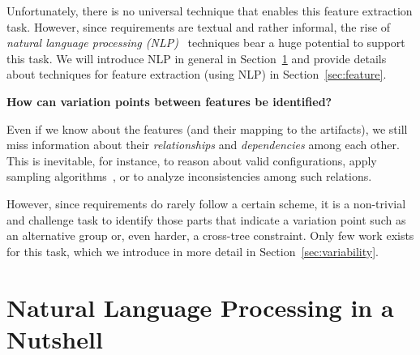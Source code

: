 \documentclass[graybox]{svmult}
\begin{document}
Unfortunately, there is no universal technique that enables this feature extraction task.
However, since requirements are textual and rather informal, the rise of \textit{natural language processing (NLP)}~\cite{IndurkhyaD10} techniques bear a huge potential to support this task.
We will introduce NLP in general in Section~\ref{sec:nlp} and provide details about techniques for feature extraction (using NLP) in Section~\ref{sec:feature}.

\begin{center}
    \textbf{How can variation points between features be identified?}
\end{center}

Even if we know about the features (and their mapping to the artifacts), we still miss information about their \textit{relationships} and \textit{dependencies} among each other.
This is inevitable, for instance, to reason about valid configurations, apply sampling algorithms~\cite{VarshosazATRMS18}, or to analyze inconsistencies among such relations.

However, since requirements do rarely follow a certain scheme, it is a non-trivial and challenge task to identify those parts that indicate a variation point such as an alternative group or, even harder, a cross-tree constraint.
Only few work exists for this task, which we introduce in more detail in Section~\ref{sec:variability}.



\section{Natural Language Processing in a Nutshell}
\label{sec:nlp}
\end{document}
